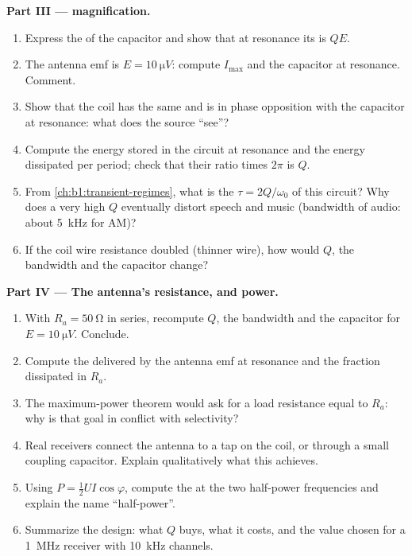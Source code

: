 \begin{problem}
\medskip
\noindent\textbf{Part III ---  magnification.}
\begin{enumerate}[resume]
  \item Express the  of the capacitor  and show
        that at resonance its  is $QE$.
  \item The antenna emf is $E = \qty{10}{\micro V}$: compute $I_{\max}$
        and the capacitor  at resonance. Comment.
  \item Show that the coil  has the same  and is in
        phase opposition with the capacitor  at resonance: what
        does the source ``see''?
  \item Compute the energy stored in the circuit at resonance and the
        energy dissipated per period; check that their ratio times
        $2\pi$ is $Q$.
  \item From \cref{ch:b1:transient-regimes}, what is the 
        $\tau = 2Q/\omega_0$ of this circuit? Why does a very high $Q$
        eventually distort speech and music (bandwidth of audio:
        about \qty{5}{kHz} for AM)?
  \item If the coil wire resistance doubled (thinner wire), how would
        $Q$, the bandwidth and the capacitor  change?
\end{enumerate}

\medskip
\noindent\textbf{Part IV --- The antenna's resistance, and power.}
\begin{enumerate}[resume]
  \item With $R_a = \qty{50}{\ohm}$ in series, recompute $Q$, the
        bandwidth and the capacitor  for $E = \qty{10}{\micro V}$.
        Conclude.
  \item Compute the  delivered by the antenna emf at
        resonance and the fraction dissipated in $R_a$.
  \item The maximum-power theorem would ask for a load resistance equal
        to $R_a$: why is that goal in conflict with selectivity?
  \item Real receivers connect the antenna to a tap on the coil, or
        through a small coupling capacitor. Explain qualitatively what
        this achieves.
  \item Using $P = \tfrac12 UI\cos\varphi$, compute the  at
        the two half-power frequencies and explain the name
        ``half-power''.
  \item Summarize the design: what $Q$ buys, what it costs, and the
        value chosen for a \qty{1}{MHz} receiver with \qty{10}{kHz}
        channels.
\end{enumerate}
\end{problem}
